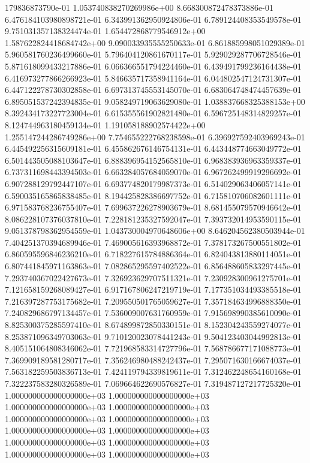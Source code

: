 179836873790e-01	1.053740838270269986e+00	8.668300872478373886e-01	6.476184103980898721e-01	6.343991362950924806e-01	6.789124408353549578e-01	9.751031357138324474e-01	1.654472868779546912e+00	1.587622824418684742e+00	9.090033935555250633e-01	6.861885998051029389e-01	5.960581760236499660e-01	5.796404120861670117e-01	5.929029287706728546e-01	5.871618099433217886e-01	6.066366551794224460e-01	6.439491799236164438e-01	6.416973277866266923e-01	5.846635717358941164e-01	6.044802547124731307e-01	6.447122278730302858e-01	6.697313745553145070e-01	6.683064748474457639e-01	6.895051537242394835e-01	9.058249719063629080e-01	1.038837668325388153e+00	8.392434173227723004e-01	6.615355561902821480e-01	6.596725148314829257e-01	8.124744963180459134e-01	1.191058188902574422e+00	1.255147244286749286e+00	7.754655222768238598e-01	6.396927592403969243e-01	6.445492256315609181e-01	6.455862676146754131e-01	6.443448774663049772e-01	6.501443505088103647e-01	6.888396954152565810e-01	6.968383936963359337e-01	6.737311698443394503e-01	6.663284057684059070e-01	6.967262499919296692e-01	6.907288129792447107e-01	6.693774820179987373e-01	6.514029063406057141e-01	6.590035165865838485e-01	8.194425828386697752e-01	6.715810706082601111e-01	6.971583768236755407e-01	7.699637226278903679e-01	8.681455079570946642e-01	8.086228107376037810e-01	7.228181235327592047e-01	7.393732014953590115e-01	9.051378798362954559e-01	1.043730004970648606e+00	8.646204562380503944e-01	7.404251370394689946e-01	7.469005616393968872e-01	7.378173267500551802e-01	6.860595596846236210e-01	6.718227615784886364e-01	6.824043813880114051e-01	6.807441845971163863e-01	7.082865295597402522e-01	6.856488605833297445e-01	7.293740367022427673e-01	7.326923629707511321e-01	7.230928300961275701e-01	7.121658159268089427e-01	6.917167806247219719e-01	7.177351034493385518e-01	7.216397287753175682e-01	7.209550501765059627e-01	7.357184634996888350e-01	7.240829686797134457e-01	7.536009007631760959e-01	7.915698990385610090e-01	8.825300375285597410e-01	8.674899872850330151e-01	8.152304243559274077e-01	8.253871096349703063e-01	9.710120023078441243e-01	9.504123403044992813e-01	8.405151064808346062e-01	7.721968583314727796e-01	7.568786677171088773e-01	7.369909189581280717e-01	7.356246980488242437e-01	7.295071630166674037e-01	7.563182259503836713e-01	7.424119794339819611e-01	7.312462248654160168e-01	7.322237583280326589e-01	7.069664622690576827e-01	7.319487127217725320e-01	1.000000000000000000e+03	1.000000000000000000e+03	1.000000000000000000e+03	1.000000000000000000e+03	1.000000000000000000e+03	1.000000000000000000e+03	1.000000000000000000e+03	1.000000000000000000e+03	1.000000000000000000e+03	1.000000000000000000e+03	1.000000000000000000e+03	1.000000000000000000e+03
